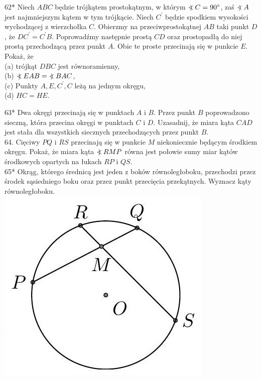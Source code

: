 \documentclass[10pt]{article}
\newcommand\Varangle{\mathop{{<\!\!\!\!\!\text{\small)}}\:}\nolimits}
\begin{document}
62* Niech \(A B C\) będzie trójkątem prostokątnym, w którym \(\Varangle C=90^{\circ}\), zaś \(\Varangle A\) jest najmniejszym kątem w tym trójkącie. Niech \(C^{\prime}\) będzie spodkiem wysokości wychodzącej z wierzchołka \(C\). Obierzmy na przeciwprostokątnej \(A B\) taki punkt \(D\), że \(D C^{\prime}=C^{\prime} B\). Poprowadźmy następnie prostą \(C D\) oraz prostopadłą do niej prostą przechodzącą przez punkt \(A\). Obie te proste przecinają się w punkcie \(E\). Pokaż, że\\
(a) trójkąt \(D B C\) jest równoramienny,\\
(b) \(\Varangle E A B=\Varangle B A C\),\\
(c) Punkty \(A, E, C^{\prime}, C\) leżą na jednym okręgu,\\
(d) \(H C=H E\).

63* Dwa okręgi przecinają się w punktach \(A\) i \(B\). Przez punkt \(B\) poprowadzono sieczną, która przecina okręgi w punktach \(C\) i \(D\). Uzasadnij, że miara kąta \(C A D\) jest stała dla wszystkich siecznych przechodzących przez punkt \(B\).\\
64. Cięciwy \(P Q\) i \(R S\) przecinają się w punkcie \(M\) niekoniecznie będącym środkiem okręgu. Pokaż, że miara kąta \(\Varangle R M P\) równa jest połowie sumy miar kątów środkowych opartych na łukach \(R P\) i \(Q S\).\\
65* Okrąg, którego średnicą jest jeden z boków równoległoboku, przechodzi przez środek sąsiedniego boku oraz przez punkt przecięcia przekątnych. Wyznacz kąty równoległoboku.\\
\includegraphics[max width=\textwidth, center]{2024_11_21_71f62bd117d375398909g-193}\\
\end{document}
